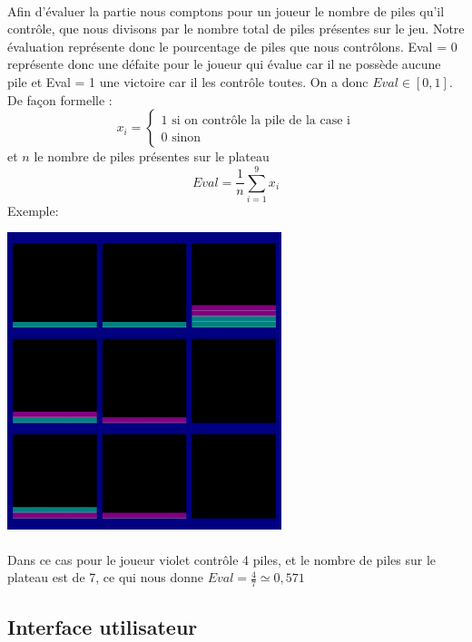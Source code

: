 \documentclass[article, backcover, french, nodocumentinfo]{upmethodology-document}
\begin{document}
				\paragraph{}
					Afin d'évaluer la partie nous comptons pour un joueur  le nombre de piles qu’il contrôle, que nous divisons par le nombre total de piles présentes sur le jeu. Notre évaluation représente donc le pourcentage de piles que nous contrôlons. Eval = 0 représente donc une défaite pour le joueur qui évalue car il ne possède aucune pile et Eval = 1 une victoire car il les contrôle toutes. On a donc $Eval \in [0,1]$.\\
					De façon formelle :
					\[
					x_{i} = \left\{
					\begin{array}{ll}
						1 \mbox{ si  on contrôle la pile de la case i} \\
						0  \mbox{ sinon}
					\end{array}
					\right.
					\]
					et $n$ le nombre de piles présentes sur le plateau
					\[Eval = \frac{1}{n}  \sum_{i = 1}^{9} x_{i}\]
					Exemple:
					\begin{center}
						\includegraphics[width=0.6\textwidth]{figures/Eval.png}
					\end{center}
				\paragraph{}
					Dans ce cas pour le joueur violet contrôle 4 piles, et le nombre de piles sur le plateau est de 7, ce qui nous donne $Eval = \frac{4}{7} \simeq 0,571$
		\subsection{Interface utilisateur}
\end{document}

